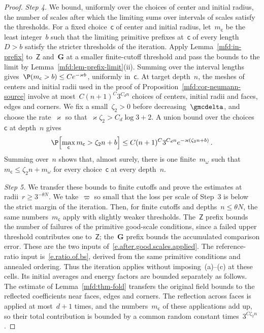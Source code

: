 \documentclass[11pt]{amsart}
\begin{document}
\begin{proof}
\smallskip

\emph{Step 4.} We bound, uniformly over the choices of center and initial radius, the number of scales after which the limiting sums over intervals of scales satisfy the thresholds. For a fixed choice~$\mathsf c$ of center and initial radius, let~$m_{\mathsf c}$ be the least integer~$b$ such that the limiting primitive prefixes at~$\mathsf c$ of every length~$D>b$ satisfy the stricter thresholds of the iteration. Apply Lemma~\ref{mfd:in-prefix} to~$\mathsf Z$ and~$\mathbf G$ at a smaller finite-cutoff threshold and pass the bounds to the limit by Lemma~\ref{mfd:lem-prefix-limit}(ii). Summing over the interval lengths gives~$\P(m_{\mathsf c}>b)\leq Ce^{-\varkappa b}$, uniformly in~$\mathsf c$. At target depth~$n$, the meshes of centers and initial radii used in the proof of Proposition~\ref{mfd:cor-neumann-source} involve at most~$C(n+1)^C3^{C_dn}$ choices of centers, initial radii and faces, edges and corners. We fix a small~$\zeta_2>0$ before decreasing~$\gmcdelta$, and choose the rate~$\varkappa$ so that~$\varkappa\zeta_2>C_d\log3+2$. A union bound over the choices~$\mathsf c$ at depth~$n$ gives
\begin{equation*}
	\P\Bigl[\max_{\mathsf c} m_{\mathsf c}>\zeta_2 n+b\Bigr]
	\leq C(n+1)^C3^{C_dn}e^{-\varkappa(\zeta_2 n+b)}\,.
\end{equation*}
Summing over~$n$ shows that, almost surely, there is one finite~$m_\omega$ such that~$m_{\mathsf c}\leq\zeta_2n+m_\omega$ for every choice~$\mathsf c$ at every depth~$n$.

\smallskip

\emph{Step 5.} We transfer these bounds to finite cutoffs and prove the estimates at radii~$r\geq 3^{-\theta N}$. We take~$\varpi$ so small that the loss per scale of Step~3 is below the strict margin of the iteration. Then, for finite cutoffs and depths~$n\leq\theta N$, the same numbers~$m_{\mathsf c}$ apply with slightly weaker thresholds. The~$\mathsf Z$ prefix bounds the number of failures of the primitive good-scale conditions, since a failed upper threshold contributes one to~$\mathsf Z$; the~$\mathbf G$ prefix bounds the accumulated comparison error. These are the two inputs of~\eqref{e.after.good.scales.applied}. The reference-ratio input is~\eqref{e.ratio.of.bs}, derived from the same primitive conditions and annealed ordering. Thus the iteration applies without imposing~(a)--(c) at these cells. Its initial averages and energy factors are bounded separately as follows. The estimate of Lemma~\ref{mfd:thm-fold} transfers the original field bounds to the reflected coefficients near faces, edges and corners. The reflection across faces is applied at most~$d+1$ times, and the numbers~$m_{\mathsf c}$ of these applications add up, so their total contribution is bounded by a common random constant times~$3^{C\zeta_2 n}$.


\end{proof}
\end{document}
